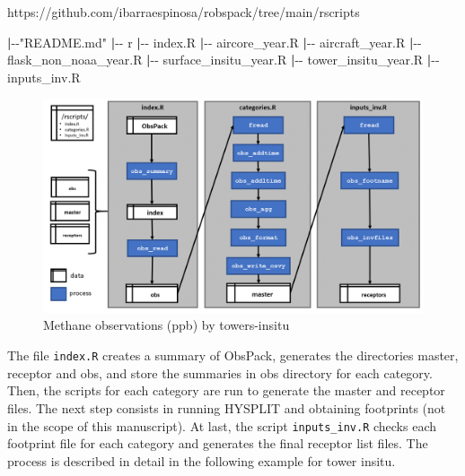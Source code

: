 \documentclass[preprint, 3p,
authoryear]{elsarticle} %
\newenvironment{Shaded}{\begin{snugshade}}{\end{snugshade}}
\newcommand{\ExtensionTok}[1]{#1}
\newcommand{\KeywordTok}[1]{\textcolor[rgb]{0.13,0.29,0.53}{\textbf{#1}}}
\newcommand{\NormalTok}[1]{#1}
\newcommand{\StringTok}[1]{\textcolor[rgb]{0.31,0.60,0.02}{#1}}
\begin{document}
https://github.com/ibarraespinosa/robspack/tree/main/rscripts

\begin{Shaded}
\begin{Highlighting}[]
\KeywordTok{|}\ExtensionTok{{-}{-}}\StringTok{"README.md"}
\KeywordTok{|}\ExtensionTok{{-}{-}}\NormalTok{ r}
    \KeywordTok{|}\ExtensionTok{{-}{-}}\NormalTok{ index.R}
    \KeywordTok{|}\ExtensionTok{{-}{-}}\NormalTok{ aircore\_year.R }
    \KeywordTok{|}\ExtensionTok{{-}{-}}\NormalTok{ aircraft\_year.R}
    \KeywordTok{|}\ExtensionTok{{-}{-}}\NormalTok{ flask\_non\_noaa\_year.R}
    \KeywordTok{|}\ExtensionTok{{-}{-}}\NormalTok{ surface\_insitu\_year.R}
    \KeywordTok{|}\ExtensionTok{{-}{-}}\NormalTok{ tower\_insitu\_year.R}
    \KeywordTok{|}\ExtensionTok{{-}{-}}\NormalTok{ inputs\_inv.R}
\end{Highlighting}
\end{Shaded}

\begin{figure}
\includegraphics[width=1\linewidth,height=0.5\textheight]{flow/Slide1} \caption{Methane observations (ppb) by towers-insitu}\label{fig:flow}
\end{figure}

The file \texttt{index.R} creates a summary of ObsPack, generates the
directories master, receptor and obs, and store the summaries in obs
directory for each category. Then, the scripts for each category are run
to generate the master and receptor files. The next step consists in
running HYSPLIT and obtaining footprints (not in the scope of this
manuscript). At last, the script \texttt{inputs\_inv.R} checks each
footprint file for each category and generates the final receptor list
files. The process is described in detail in the following example for
tower insitu.
\end{document}
